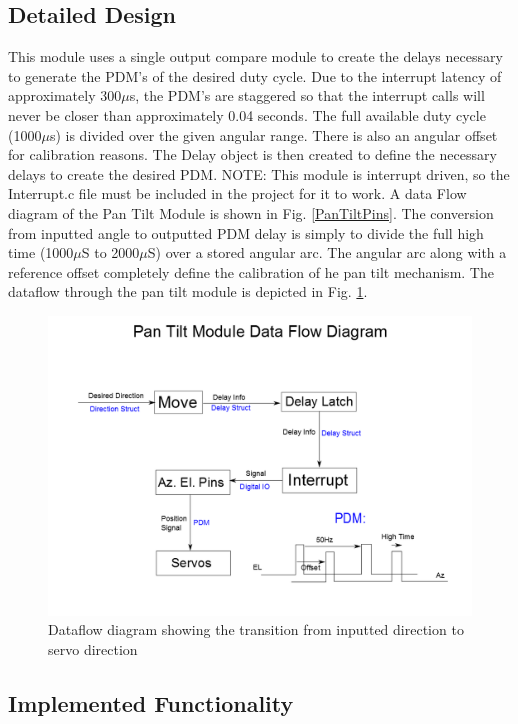 \documentclass[]{report}
\begin{document}
\subsection{Detailed Design}
This module uses a single output compare module to create the delays necessary to generate the PDM's of the desired duty cycle. Due to the interrupt latency of approximately 300$\mu$s, the PDM's are staggered so that the interrupt calls will never be closer than approximately 0.04 seconds. The full available duty cycle (1000$\mu$s) is divided over the given angular range. There is also an angular offset for calibration reasons. The Delay object is then created to define the necessary delays to create the desired PDM.
NOTE: This module is interrupt driven, so the Interrupt.c file must be included in the project for it to work. \newline
A data Flow diagram of the Pan Tilt Module is shown in Fig. \ref{PanTiltPins}. \newline
The conversion from inputted angle to outputted PDM delay is simply to divide the full high time (1000$\mu$S to 2000$\mu$S) over a stored angular arc. The angular arc along with a reference offset completely define the calibration of he pan tilt mechanism. \newline
The dataflow through the pan tilt module is depicted in Fig. \ref{fig:PanTiltDataFlowDiagram}.

\begin{figure}
\centering
\includegraphics[width=0.7\linewidth]{"../Diagrams/Pan Tilt Data Flow Diagram"}
\caption[Pan Tilt Dataflow Diagram]{Dataflow diagram showing the transition from inputted direction to servo direction}
\label{fig:PanTiltDataFlowDiagram}
\end{figure}

\subsection{Implemented Functionality}
\end{document}
